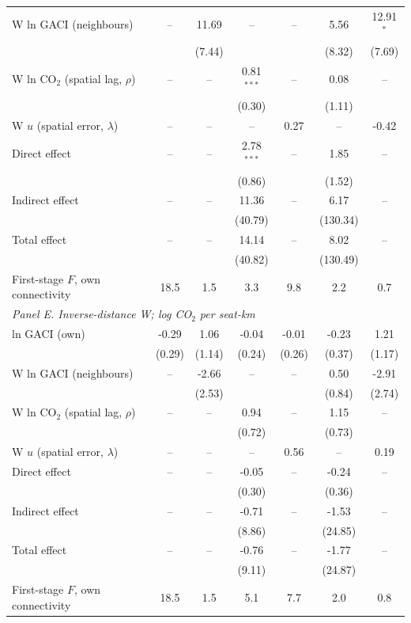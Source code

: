 \begin{table}[htbp]
\begin{threeparttable}
\begin{tabular}{lcccccc}
  W ln GACI (neighbours) & -- & 11.69 & -- & -- & 5.56 & 12.91$^{*}$ \\
   &  & (7.44) &  &  & (8.32) & (7.69) \\
  W ln CO$_2$ (spatial lag, $\rho$) & -- & -- & 0.81$^{***}$ & -- & 0.08 & -- \\
   &  &  & (0.30) &  & (1.11) &  \\
  W $u$ (spatial error, $\lambda$) & -- & -- & -- & 0.27 & -- & -0.42 \\
  Direct effect & -- & -- & 2.78$^{***}$ & -- & 1.85 & -- \\
   &  &  & (0.86) &  & (1.52) &  \\
  Indirect effect & -- & -- & 11.36 & -- & 6.17 & -- \\
   &  &  & (40.79) &  & (130.34) &  \\
  Total effect & -- & -- & 14.14 & -- & 8.02 & -- \\
   &  &  & (40.82) &  & (130.49) &  \\
  First-stage $F$, own connectivity & 18.5 & 1.5 & 3.3 & 9.8 & 2.2 & 0.7 \\
\midrule
\multicolumn{7}{l}{\textit{Panel E. Inverse-distance W; log CO$_2$ per seat-km}} \\
  ln GACI (own) & -0.29 & 1.06 & -0.04 & -0.01 & -0.23 & 1.21 \\
   & (0.29) & (1.14) & (0.24) & (0.26) & (0.37) & (1.17) \\
  W ln GACI (neighbours) & -- & -2.66 & -- & -- & 0.50 & -2.91 \\
   &  & (2.53) &  &  & (0.84) & (2.74) \\
  W ln CO$_2$ (spatial lag, $\rho$) & -- & -- & 0.94 & -- & 1.15 & -- \\
   &  &  & (0.72) &  & (0.73) &  \\
  W $u$ (spatial error, $\lambda$) & -- & -- & -- & 0.56 & -- & 0.19 \\
  Direct effect & -- & -- & -0.05 & -- & -0.24 & -- \\
   &  &  & (0.30) &  & (0.36) &  \\
  Indirect effect & -- & -- & -0.71 & -- & -1.53 & -- \\
   &  &  & (8.86) &  & (24.85) &  \\
  Total effect & -- & -- & -0.76 & -- & -1.77 & -- \\
   &  &  & (9.11) &  & (24.87) &  \\
  First-stage $F$, own connectivity & 18.5 & 1.5 & 5.1 & 7.7 & 2.0 & 0.8 \\

\end{tabular}
\end{threeparttable}
\end{table}
